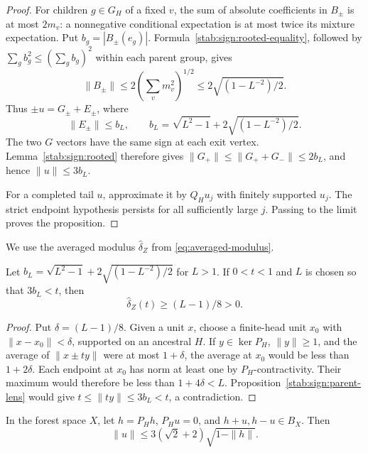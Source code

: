 \begin{proof}
For children $g\in G_H$ of a fixed $v$, the sum of absolute
coefficients in $B_\pm$ is at most $2m_v$: a nonnegative
conditional expectation is at most twice its mixture expectation.
Put $b_g=|B_\pm(e_g)|$. Formula~\eqref{stab:sign:rooted-equality},
followed by $\sum_g b_g^2\le(\sum_g b_g)^2$ within each parent
group, gives
\[
 \|B_\pm\|\le2\left(\sum_vm_v^2\right)^{1/2}
       \le2\sqrt{(1-L^{-2})/2}.
\]
Thus $\pm u=G_\pm+E_\pm$, where
\[
 \|E_\pm\|\le b_L,
 \qquad b_L=\sqrt{L^2-1}+2\sqrt{(1-L^{-2})/2}.
\]
The two $G$ vectors have the same sign at each exit vertex.
Lemma~\ref{stab:sign:rooted} therefore gives
$\|G_+\|\le\|G_++G_-\|\le2b_L$, and hence
$\|u\|\le3b_L$.

For a completed tail $u$, approximate it by $Q_Hu_j$ with finitely
supported $u_j$. The strict endpoint hypothesis persists for all
sufficiently large $j$. Passing to the limit proves the proposition.
\end{proof}

We use the averaged modulus $\widehat\delta_Z$ from
\eqref{eq:averaged-modulus}.

\begin{corollary}\label{stab:sign:parent-modulus}
Let $b_L=\sqrt{L^2-1}+2\sqrt{(1-L^{-2})/2}$ for $L>1$.
If $0<t<1$ and $L$ is chosen so that $3b_L<t$, then
\[
 \widehat\delta_Z(t)\ge (L-1)/8>0.
\]
\end{corollary}

\begin{proof}
Put $\delta=(L-1)/8$. Given a unit $x$, choose a finite-head unit
$x_0$ with $\|x-x_0\|<\delta$, supported on an ancestral $H$.
If $y\in\ker P_H$, $\|y\|\ge1$, and the average of
$\|x\pm ty\|$ were at most $1+\delta$, the average at $x_0$
would be less than $1+2\delta$. Each endpoint at $x_0$ has norm at
least one by $P_H$-contractivity. Their maximum would therefore be
less than $1+4\delta<L$. Proposition~\ref{stab:sign:parent-lens}
would give $t\le\|ty\|\le3b_L<t$, a contradiction.
\end{proof}

\begin{corollary}
\label{stab:sign:forest-parent-lens}
In the forest space $X$, let $h=P_Hh$, $P_Hu=0$, and
$h+u,h-u\in B_X$.  Then
\begin{equation}\label{stab:sign:forest-parent-bound}
 \|u\|\le3(\sqrt2+2)\sqrt{1-\|h\|}.
\end{equation}
\end{corollary}

